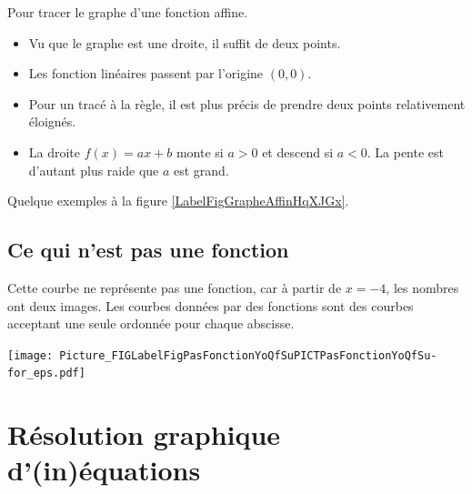 Pour tracer le graphe d'une fonction affine.
\begin{itemize}
    \item
        Vu que le graphe est une droite, il suffit de deux points.
    \item
        Les fonction linéaires passent par l'origine \( (0,0)\).
    \item 
        Pour un tracé à la règle, il est plus précis de prendre deux points relativement éloignés.
    \item
        La droite \( f(x)=ax+b\) monte si \( a>0\) et descend si \( a<0\). La pente est d'autant plus raide que \( a\) est grand.
\end{itemize}

Quelque exemples à la figure \ref{LabelFigGrapheAffinHqXJGx}.
\newcommand{\CaptionFigGrapheAffinHqXJGx}{Des graphes de fonctions linéaires et affines.}


\subsection{Ce qui n'est pas une fonction}


\begin{multicols}{2}
    Cette courbe ne représente pas une fonction, car à partir de \( x=-4\), les nombres ont deux images. Les courbes données par des fonctions sont des courbes acceptant une seule ordonnée pour chaque abscisse.

\columnbreak

\texttt{[image: Picture\_FIGLabelFigPasFonctionYoQfSuPICTPasFonctionYoQfSu-for\_eps.pdf]}

\end{multicols}

\section{Résolution graphique d'(in)équations} 

